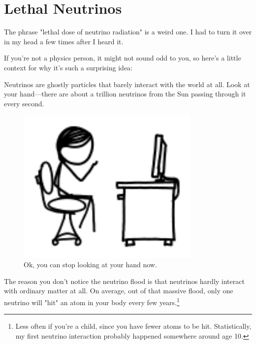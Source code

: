 {{
\chapter{Lethal Neutrinos}
}

\hfill{}

{The phrase "lethal dose of neutrino radiation" is a weird one. I had to turn it over in my head a few times after I heard it.}

{If you're not a physics person, it might not sound odd to you, so here's a little context for why it's such a surprising idea:}

{Neutrinos are ghostly particles that barely interact with the world at all. Look at your hand—there are about a trillion neutrinos from the Sun passing through it every second.}

\begin{figure}[!htbp]
\centering
\includegraphics[scale=0.5, max width=0.8\textwidth]{imgs/a/73/neutrinos_hand.png}
\caption{Ok, you can stop looking at your hand now.}
\end{figure}

{The reason you don't notice the neutrino flood is that neutrinos hardly interact with ordinary matter at all. On average, out of that massive flood, only one neutrino will "hit" an atom in your body every few years.{\footnote{Less often if you're a child, since you have fewer atoms to be hit. Statistically, my first neutrino interaction probably happened somewhere around age 10.} } }

}
